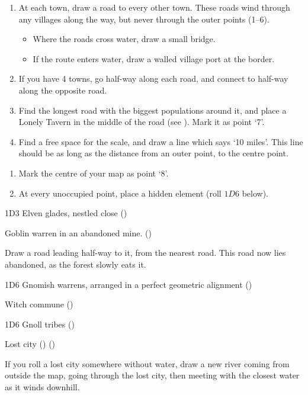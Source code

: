 \begin{multicols}{2}
\begin{enumerate}
  \item
  At each town, draw a road to every other town.
  These roads wind through any villages along the way, but never through the outer points (1--6).
  \begin{itemize}
    \item
    Where the roads cross water, draw a small bridge.
    \item
    If the route enters water, draw a walled village port at the border.
  \end{itemize}
  \item
  If you have 4 towns, go half-way along each road, and connect to half-way along the opposite road.
  \item
  Find the longest road with the biggest populations around it, and place a Lonely Tavern in the middle of the road (see ).
  Mark it as point `7'.
  \item
  Find a free space for the scale, and draw a line which says `10 miles'.
  This line should be as long as the distance from an outer point, to the centre point.
\end{enumerate}

\label{mapOddities}

\begin{enumerate}
  \item
  Mark the centre of your map as point `8'.
  \item
  At every unoccupied point, place a hidden element (roll $1D6$ below).
\end{enumerate}

\begin{multicols}{2}
\begin{dlist}\raggedright
\item
  1D3 Elven glades, nestled close (\El)
\item
  Goblin warren in an abandoned mine. (\N)

  Draw a road leading half-way to it, from the nearest road.
  This road now lies abandoned, as the forest slowly eats it.
\item
  1D6 Gnomish warrens, arranged in a perfect geometric alignment (\Gn)
  \columnbreak
\item
  Witch commune (\Hu)
\item
  1D6 Gnoll tribes (\Nl)
\item
  Lost city (\D) ()

  If you roll a lost city somewhere without water, draw a new river coming from outside the map, going through the lost city, then meeting with the closest water as it winds downhill.
\end{dlist}
\end{multicols}


\end{multicols}
